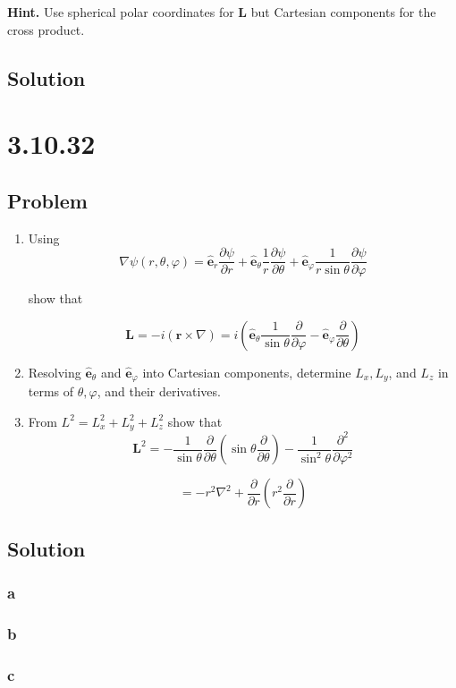 \documentclass[12pt]{article}
\begin{document}
\textbf{Hint.} Use spherical polar coordinates for \textbf{L}
but Cartesian components for the cross product.

\subsection{Solution}

\section{3.10.32}

\subsection{Problem}

\begin{enumerate}[label= \textbf{(\alph*)}]
    \item Using
          \[
              \nabla \psi (r, \theta, \varphi) = \hat{\textbf{e}}_r \frac{\partial \psi}{\partial r}
              + \hat{\textbf{e}}_\theta \frac{1}{r} \frac{\partial \psi}{\partial \theta}
              + \hat{\textbf{e}}_\varphi \frac{1}{r \sin{\theta}} \frac{\partial \psi}{\partial \varphi}
          \]

          show that

          \[
              \textbf{L} = -i \left(\textbf{r} \times \nabla\right)
              = i
              \left(
              \hat{\textbf{e}}_\theta \frac{1}{\sin{\theta}} \frac{\partial}{\partial \varphi}
              - \hat{\textbf{e}}_\varphi \frac{\partial}{\partial \theta}
              \right)
          \]

    \item Resolving \(\hat{\textbf{e}}_\theta \) and \(\hat{\textbf{e}}_\varphi \)
          into Cartesian components, determine \(L_x, L_y\), and \(L_z\) in terms of
          \(\theta , \varphi \), and their derivatives.

    \item From \(L^2 = L_x^2 + L_y^2 + L_z^2\) show that
          \[
              \textbf{L}^2 = -\frac{1}{\sin{\theta}} \frac{\partial}{\partial \theta}
              \left(\sin{\theta} \frac{\partial}{\partial \theta}\right)
              - \frac{1}{\sin^2{\theta}} \frac{\partial^2}{\partial \varphi^2}
          \]

          \[
              = -r^2 \nabla^2 + \frac{\partial}{\partial r} \left(r^2 \frac{\partial}{\partial r}\right)
          \]
\end{enumerate}

\subsection{Solution}

\subsubsection{a}

\subsubsection{b}

\subsubsection{c}



\nocite{arfken2013mathematical}
\nocite{El-Deeb_PEU-356_Assignments}
\end{document}
